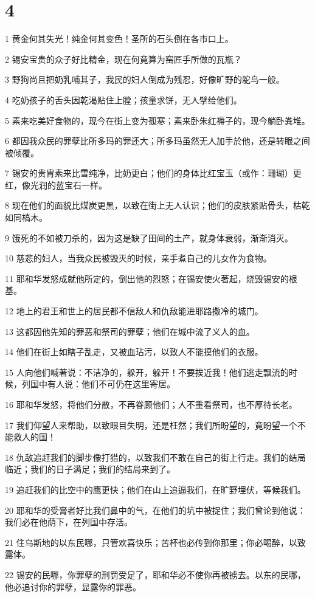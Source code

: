 \chapter{4}

\par 1 黄金何其失光！纯金何其变色！圣所的石头倒在各市口上。
\par 2 锡安宝贵的众子好比精金，现在何竟算为窑匠手所做的瓦瓶？
\par 3 野狗尚且把奶乳哺其子，我民的妇人倒成为残忍，好像旷野的鸵鸟一般。
\par 4 吃奶孩子的舌头因乾渴贴住上膛；孩童求饼，无人擘给他们。
\par 5 素来吃美好食物的，现今在街上变为孤寒；素来卧朱红褥子的，现今躺卧粪堆。
\par 6 都因我众民的罪孽比所多玛的罪还大；所多玛虽然无人加手於他，还是转眼之间被倾覆。
\par 7 锡安的贵胄素来比雪纯净，比奶更白；他们的身体比红宝玉（或作：珊瑚）更红，像光润的蓝宝石一样。
\par 8 现在他们的面貌比煤炭更黑，以致在街上无人认识；他们的皮肤紧贴骨头，枯乾如同槁木。
\par 9 饿死的不如被刀杀的，因为这是缺了田间的土产，就身体衰弱，渐渐消灭。
\par 10 慈悲的妇人，当我众民被毁灭的时候，亲手煮自己的儿女作为食物。
\par 11 耶和华发怒成就他所定的，倒出他的烈怒；在锡安使火著起，烧毁锡安的根基。
\par 12 地上的君王和世上的居民都不信敌人和仇敌能进耶路撒冷的城门。
\par 13 这都因他先知的罪恶和祭司的罪孽；他们在城中流了义人的血。
\par 14 他们在街上如瞎子乱走，又被血玷污，以致人不能摸他们的衣服。
\par 15 人向他们喊著说：不洁净的，躲开，躲开！不要挨近我！他们逃走飘流的时候，列国中有人说：他们不可仍在这里寄居。
\par 16 耶和华发怒，将他们分散，不再眷顾他们；人不重看祭司，也不厚待长老。
\par 17 我们仰望人来帮助，以致眼目失明，还是枉然；我们所盼望的，竟盼望一个不能救人的国！
\par 18 仇敌追赶我们的脚步像打猎的，以致我们不敢在自己的街上行走。我们的结局临近；我们的日子满足；我们的结局来到了。
\par 19 追赶我们的比空中的鹰更快；他们在山上追逼我们，在旷野埋伏，等候我们。
\par 20 耶和华的受膏者好比我们鼻中的气，在他们的坑中被捉住；我们曾论到他说：我们必在他荫下，在列国中存活。
\par 21 住乌斯地的以东民哪，只管欢喜快乐；苦杯也必传到你那里；你必喝醉，以致露体。
\par 22 锡安的民哪，你罪孽的刑罚受足了，耶和华必不使你再被掳去。以东的民哪，他必追讨你的罪孽，显露你的罪恶。

